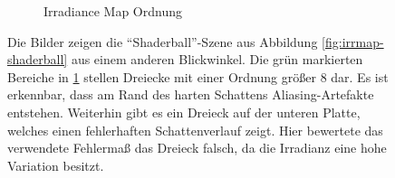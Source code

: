\begin{figure}[H]
\begin{subfigure}[b]{0.5\textwidth}
			\caption{Irradiance Map Ordnung}
			\label{subfig:irrmap-shaderball2-irrmap-order}
		\end{subfigure}
		\caption[Irradiance Map Fehler der \enquote{Shaderball}-Szene mit direktionaler Lichtquelle]{Die Bilder zeigen die \enquote{Shaderball}-Szene aus Abbildung \ref{fig:irrmap-shaderball} aus einem anderen Blickwinkel. Die grün markierten Bereiche in \ref{subfig:irrmap-shaderball2-irrmap-order} stellen Dreiecke mit einer Ordnung größer $8$ dar. Es ist erkennbar, dass am Rand des harten Schattens Aliasing-Artefakte entstehen. Weiterhin gibt es ein Dreieck auf der unteren Platte, welches einen fehlerhaften Schattenverlauf zeigt. Hier bewertete das verwendete Fehlermaß das Dreieck falsch, da die Irradianz eine hohe Variation besitzt.}
		\label{fig:irrmap-shaderball2}
	\end{figure}


